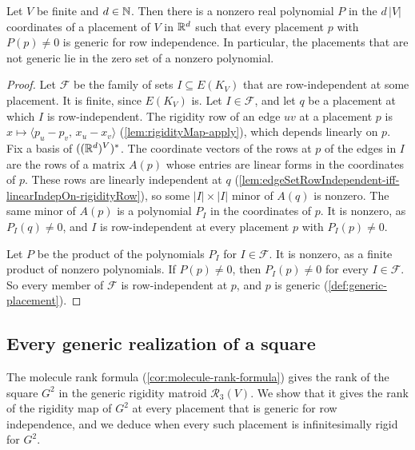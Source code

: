 \begin{lemma}
  \label{lem:generic-placement-abundance}
  \leanok
  Let $V$ be finite and $d \in {\mathbb{N}}$. Then there is a nonzero real
  polynomial $P$ in the $d\,|V|$ coordinates of a placement of $V$ in
  ${\mathbb{R}}^{d}$ such that every placement $p$ with $P(p) \neq 0$ is generic
  for row independence. In particular, the placements that are not
  generic lie in the zero set of a nonzero polynomial.
\end{lemma}
\begin{proof}
  \leanok
  Let $\mathcal{F}$ be the family of sets $I \subseteq E(K_V)$ that are
  row-independent at some placement. It is finite, since $E(K_V)$ is.
  Let $I \in \mathcal{F}$, and let $q$ be a placement at which $I$ is
  row-independent. The rigidity row of an edge $uv$ at a placement $p$
  is $x \mapsto \langle p_u - p_v,\, x_u - x_v \rangle$
  (\cref{lem:rigidityMap-apply}), which depends linearly on $p$. Fix a
  basis of $(({\mathbb{R}}^{d})^{V})^{*}$. The coordinate vectors of the rows at
  $p$ of the edges in $I$ are the rows of a matrix $A(p)$ whose entries
  are linear forms in the coordinates of $p$. These rows are linearly
  independent at $q$
  (\cref{lem:edgeSetRowIndependent-iff-linearIndepOn-rigidityRow}), so
  some $|I| \times |I|$ minor of $A(q)$ is nonzero. The same minor of
  $A(p)$ is a polynomial $P_I$ in the coordinates of $p$. It is nonzero,
  as $P_I(q) \neq 0$, and $I$ is row-independent at every placement $p$
  with $P_I(p) \neq 0$.

  Let $P$ be the product of the polynomials $P_I$ for
  $I \in \mathcal{F}$. It is nonzero, as a finite product of nonzero
  polynomials. If $P(p) \neq 0$, then $P_I(p) \neq 0$ for every
  $I \in \mathcal{F}$. So every member of $\mathcal{F}$ is
  row-independent at $p$, and $p$ is generic
  (\cref{def:generic-placement}).
\end{proof}

\subsection{Every generic realization of a square}
\label{sec:generic-lift-molecule}

The molecule rank formula (\cref{cor:molecule-rank-formula}) gives the
rank of the square $G^2$ in the generic rigidity matroid
$\mathcal{R}_3(V)$. We show that it gives the rank of the rigidity map
of $G^2$ at every placement that is generic for row independence, and
we deduce when every such placement is infinitesimally rigid for $G^2$.

